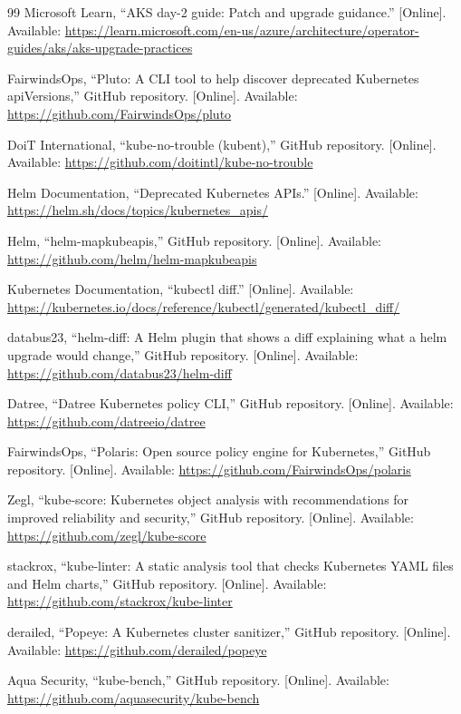 \documentclass[10pt,journal]{IEEEtran}
\begin{document}
\begin{thebibliography}{99}
Microsoft Learn, ``AKS day-2 guide: Patch and upgrade guidance.'' [Online]. Available: \url{https://learn.microsoft.com/en-us/azure/architecture/operator-guides/aks/aks-upgrade-practices}

FairwindsOps, ``Pluto: A CLI tool to help discover deprecated Kubernetes apiVersions,'' GitHub repository. [Online]. Available: \url{https://github.com/FairwindsOps/pluto}

DoiT International, ``kube-no-trouble (kubent),'' GitHub repository. [Online]. Available: \url{https://github.com/doitintl/kube-no-trouble}

Helm Documentation, ``Deprecated Kubernetes APIs.'' [Online]. Available: \url{https://helm.sh/docs/topics/kubernetes_apis/}

Helm, ``helm-mapkubeapis,'' GitHub repository. [Online]. Available: \url{https://github.com/helm/helm-mapkubeapis}

Kubernetes Documentation, ``kubectl diff.'' [Online]. Available: \url{https://kubernetes.io/docs/reference/kubectl/generated/kubectl_diff/}

databus23, ``helm-diff: A Helm plugin that shows a diff explaining what a helm upgrade would change,'' GitHub repository. [Online]. Available: \url{https://github.com/databus23/helm-diff}

Datree, ``Datree Kubernetes policy CLI,'' GitHub repository. [Online]. Available: \url{https://github.com/datreeio/datree}

FairwindsOps, ``Polaris: Open source policy engine for Kubernetes,'' GitHub repository. [Online]. Available: \url{https://github.com/FairwindsOps/polaris}

Zegl, ``kube-score: Kubernetes object analysis with recommendations for improved reliability and security,'' GitHub repository. [Online]. Available: \url{https://github.com/zegl/kube-score}

stackrox, ``kube-linter: A static analysis tool that checks Kubernetes YAML files and Helm charts,'' GitHub repository. [Online]. Available: \url{https://github.com/stackrox/kube-linter}

derailed, ``Popeye: A Kubernetes cluster sanitizer,'' GitHub repository. [Online]. Available: \url{https://github.com/derailed/popeye}

Aqua Security, ``kube-bench,'' GitHub repository. [Online]. Available: \url{https://github.com/aquasecurity/kube-bench}


\end{thebibliography}
\end{document}
